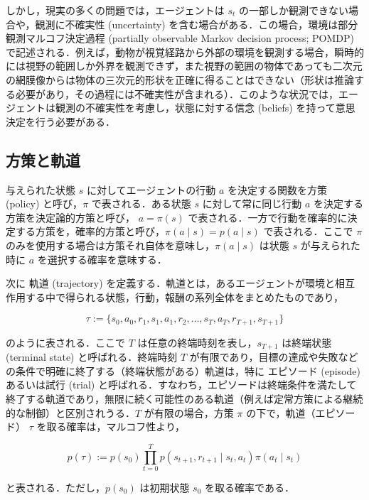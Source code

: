 \documentclass[titlepage]{ltjsbook}
\begin{document}
しかし，現実の多くの問題では，エージェントは $s_t$ の一部しか観測できない場合や，観測に不確実性 (uncertainty) を含む場合がある．この場合，環境は部分観測マルコフ決定過程 (partially observable Markov decision process; POMDP) で記述される．例えば，動物が視覚経路から外部の環境を観測する場合，瞬時的には視野の範囲しか外界を観測できず，また視野の範囲の物体であっても二次元の網膜像からは物体の三次元的形状を正確に得ることはできない（形状は推論する必要があり，その過程には不確実性が含まれる）．このような状況では，エージェントは観測の不確実性を考慮し，状態に対する信念 (beliefs) を持って意思決定を行う必要がある．

\subsection{方策と軌道}
与えられた状態 $s$ に対してエージェントの行動 $a$ を決定する関数を方策 (policy) と呼び，$\pi$ で表される．ある状態 $s$ に対して常に同じ行動 $a$ を決定する方策を決定論的方策と呼び， $a=\pi(s)$ で表される．一方で行動を確率的に決定する方策を，確率的方策と呼び，$\pi(a \mid s) = p(a \mid s)$ で表される．ここで $\pi$ のみを使用する場合は方策それ自体を意味し，$\pi(a \mid s)$ は状態 $s$ が与えられた時に $a$ を選択する確率を意味する．

次に 軌道 (trajectory) を定義する．軌道とは，あるエージェントが環境と相互作用する中で得られる状態，行動，報酬の系列全体をまとめたものであり，

\begin{equation}
\tau := \{s_0, a_0, r_1, s_1, a_1, r_2, \ldots, s_T, a_T, r_{T+1}, s_{T+1}\}
\end{equation}
  
のように表される．ここで $T$ は任意の終端時刻を表し，$s_{T+1}$ は終端状態 (terminal state) と呼ばれる．終端時刻 $T$ が有限であり，目標の達成や失敗などの条件で明確に終了する（終端状態がある）軌道は，特に エピソード (episode) あるいは試行 (trial) と呼ばれる．すなわち，エピソードは終端条件を満たして終了する軌道であり，無限に続く可能性のある軌道（例えば定常方策による継続的な制御）と区別されうる．$T$ が有限の場合，方策 $\pi$ の下で，軌道（エピソード） $\tau$ を取る確率は，マルコフ性より，

\begin{equation}
p(\tau) := p(s_0) \prod_{t=0}^T p(s_{t+1}, r_{t+1}\mid s_t, a_t) \pi(a_t \mid s_t)
\end{equation}

と表される．ただし，$p(s_0)$ は初期状態 $s_0$ を取る確率である．
\end{document}

